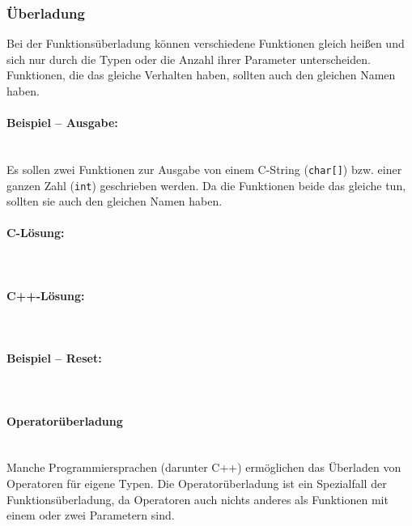 		\subsubsection{Überladung}
			Bei der Funktionsüberladung können verschiedene Funktionen gleich heißen und sich nur durch die Typen oder die
			Anzahl ihrer Parameter unterscheiden. Funktionen, die das gleiche Verhalten haben, sollten auch den gleichen
			Namen haben.
			
			\paragraph*{Beispiel -- Ausgabe:}\mbox{}\\
				Es sollen zwei Funktionen zur Ausgabe von einem C-String (\lstinline|char[]|) bzw. einer ganzen Zahl
				(\lstinline|int|) geschrieben werden. Da die Funktionen beide das gleiche tun, sollten sie auch den gleichen
				Namen haben.
				
				\paragraph*{C-Lösung:}\mbox{}\\
					\UseRawInputEncoding{}
					\UseRawInputEncoding{}
				
				\paragraph*{C++-Lösung:}\mbox{}\\
					\UseRawInputEncoding{}
					\UseRawInputEncoding{}
			
			\paragraph*{Beispiel -- Reset:}\mbox{}\\
				\UseRawInputEncoding{}
		
			\paragraph{Operatorüberladung}\mbox{}\\
				Manche Programmiersprachen (darunter C++) ermöglichen das Überladen von Operatoren für eigene Typen. Die
				Operatorüberladung ist ein Spezialfall der Funktionsüberladung, da Operatoren auch nichts anderes als
				Funktionen mit einem oder zwei Parametern sind.
				
